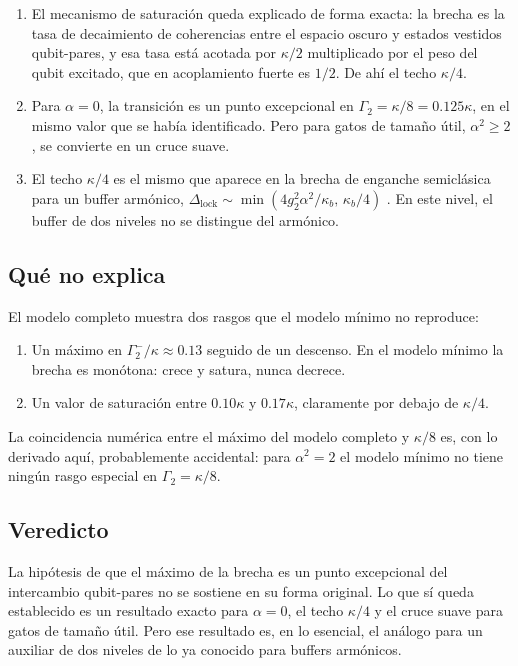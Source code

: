 \documentclass[11pt]{report}
\newcommand{\GG}{\Gamma_{2}}
\begin{document}
\begin{enumerate}
\item El mecanismo de saturaci\'on queda explicado de forma exacta: la brecha es la tasa de decaimiento de coherencias entre el espacio oscuro y estados vestidos qubit-pares, y esa tasa est\'a acotada por $\kappa/2$ multiplicado por el peso del qubit excitado, que en acoplamiento fuerte es $1/2$. De ah\'i el techo $\kappa/4$.
\item Para $\alpha=0$, la transici\'on es un punto excepcional en $\GG=\kappa/8=0.125\kappa$, en el mismo valor que se hab\'ia identificado. Pero para gatos de tama\~no \'util, $\alpha^{2}\geq2$, se convierte en un cruce suave.
\item El techo $\kappa/4$ es el mismo que aparece en la brecha de enganche semicl\'asica para un buffer arm\'onico, $\Delta_{\mathrm{lock}}\sim\min(4g_{2}^{2}\alpha^{2}/\kappa_{b},\,\kappa_{b}/4)$ \cite{Ferrari2026}. En este nivel, el buffer de dos niveles no se distingue del arm\'onico.
\end{enumerate}

\subsection{Qu\'e no explica}

El modelo completo muestra dos rasgos que el modelo m\'inimo no reproduce:
\begin{enumerate}
\item Un m\'aximo en $\Gamma_{2}^{-}/\kappa\approx0.13$ seguido de un descenso. En el modelo m\'inimo la brecha es mon\'otona: crece y satura, nunca decrece.
\item Un valor de saturaci\'on entre $0.10\kappa$ y $0.17\kappa$, claramente por debajo de $\kappa/4$.
\end{enumerate}
La coincidencia num\'erica entre el m\'aximo del modelo completo y $\kappa/8$ es, con lo derivado aqu\'i, probablemente accidental: para $\alpha^{2}=2$ el modelo m\'inimo no tiene ning\'un rasgo especial en $\GG=\kappa/8$.

\subsection{Veredicto}

La hip\'otesis de que el m\'aximo de la brecha es un punto excepcional del intercambio qubit-pares no se sostiene en su forma original. Lo que s\'i queda establecido es un resultado exacto para $\alpha=0$, el techo $\kappa/4$ y el cruce suave para gatos de tama\~no \'util. Pero ese resultado es, en lo esencial, el an\'alogo para un auxiliar de dos niveles de lo ya conocido para buffers arm\'onicos.
\end{document}
